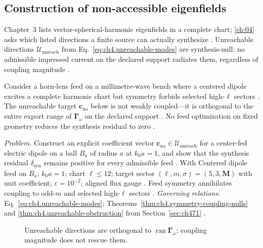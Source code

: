 \subsection{Construction of non-accessible eigenfields}
\label{sec:ch4102}
Chapter~3 lists vector-spherical-harmonic eigenfields in a complete chart; \ref{ch:04} asks which listed directions a finite source can actually synthesize \cite{stratton1941}. Unreachable directions $\mathcal{U}_{\mathrm{unreach}}$ from Eq.~\eqref{eq:ch4.unreachable-modes} are synthesis-null: no admissible impressed current on the declared support radiates them, regardless of coupling magnitude \cite{stratton1941}.
\begin{physicalvignette}
Consider a horn-lens feed on a millimetre-wave bench where a centered dipole excites a complete harmonic chart but symmetry forbids selected high-$\ell$ sectors \cite{harrington2001}. The unreachable target $\mathbf{c}_{\mathrm{na}}$ below is not weakly coupled---it is orthogonal to the entire export range of $\boldsymbol{\Gamma}_\omega$ on the declared support \cite{stratton1941}. No feed optimization on fixed geometry reduces the synthesis residual to zero \cite{hansen1988}.
\end{physicalvignette}
\emph{Problem.} Construct an explicit coefficient vector $\mathbf{c}_{\mathrm{na}}\in\mathcal{U}_{\mathrm{unreach}}$ for a center-fed electric dipole on a ball $B_{a}$ of radius $a$ at $k_{0}a=1$, and show that the synthesis residual $\delta_{\mathrm{syn}}$ remains positive for every admissible feed .
With Centered dipole feed on $B_{a}$; $k_{0}a=1$; chart $\ell\le12$; target sector $(\ell,m,\sigma)=(5,3,\mathbf{M})$ with unit coefficient; $\varepsilon=10^{-2}$; aligned flux gauge . Feed symmetry annihilates coupling to odd-$m$ and selected high-$\ell$ sectors .
\emph{Governing relations.} Eq.~\eqref{eq:ch4.unreachable-modes}; Theorems~\ref{thm:ch4.symmetry-coupling-nulls} and \ref{thm:ch4.unreachable-obstruction} from Section~\ref{sec:ch471} .
\begin{figure}[t]
\centering
{}
\caption{Unreachable directions are orthogonal to $\operatorname{ran}\boldsymbol{\Gamma}_\omega$; coupling magnitude does not rescue them.}
\label{fig:ch4.ex-unreachable-modes}
\end{figure}

